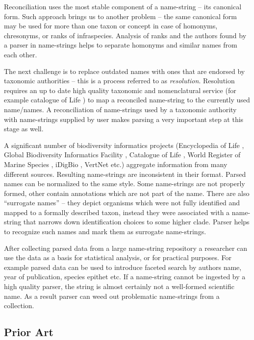 \documentclass{bmcart}
\begin{document}
Reconciliation uses the most stable component of a name-string -- its canonical
form. Such approach brings us to another problem -- the same canonical form may
be used for more than one taxon or concept in case of homonyms, chresonyms, or
ranks of infraspecies. Analysis of ranks and the authors found by a
parser in name-strings helps to separate homonyms and similar names from each
other.

The next challenge is to replace outdated names with ones that are endorsed by
taxonomic authorities -- this is a process referred to as \textit{resolution}.
Resolution requires an up to date high quality taxonomic and nomenclatural
service (for example catalogue of Life \cite{col}) to map a reconciled
name-string to the currently used name/names. A reconciliation of name-strings
used by a taxonomic authority with name-strings supplied by user makes parsing
a very important step at this stage as well.

A significant number of biodiversity informatics projects (Encyclopedia of Life
\cite{eol}, Global Biodiversity Informatics Facility \cite{gbif}, Catalogue of
Life \cite{col}, World Register of Marine Species \cite{worms}, iDigBio
\cite{idigbio}, VertNet \cite{vertnet} etc.) aggregate information from many
different sources.  Resulting name-strings are inconsistent in their format.
Parsed names can be normalized to the same style. Some name-strings are not
properly formed, other contain annotations which are not part of the name.
There are also “surrogate names” -- they depict organisms which were not fully
identified and mapped to a formally described taxon, instead they were
associated with a name-string that narrows down identification choices to some
higher clade. Parser helps to recognize such names and mark them as surrogate
name-strings.

After collecting parsed data from a large name-string repository a researcher
can use the data as a basis for statistical analysis, or for practical
purposes. For example parsed data can be used to introduce faceted search by
authors name, year of publication, species epithet etc. If a name-string cannot
be ingested by a high quality parser, the string is almost certainly not a
well-formed scientific name. As a result parser can weed out problematic
name-strings from a collection.

\subsection*{Prior Art}
\end{document}
